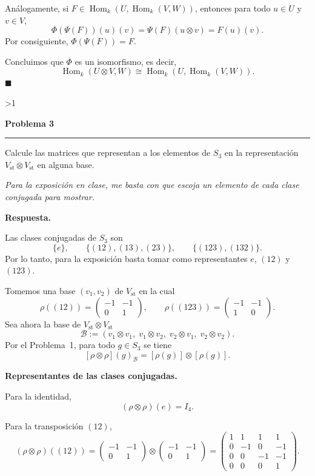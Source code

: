 \documentclass[10pt,a4paper]{article}
\newcommand{\Hom}{\operatorname{Hom}}
\newcommand{\inlinehead}[2][repblue]{%
  \par\smallskip
  {\color{#1}\bfseries #2.}\hspace{0.45em}%
}
\newcommand{\answer}{\inlinehead{Respuesta}}
\newcounter{probcnt}
\newcommand{\problem}[2]{%
  \stepcounter{probcnt}%
  \ifnum\value{probcnt}>1\newpage\fi
  \par\vspace{0.25em}
  {\large\bfseries\color{repblue} Problema #1}\par
  {\color{repline}\rule{\linewidth}{0.55pt}}\par
  \begin{tcolorbox}[
    breakable,
    colback=white,
    colframe=repline,
    borderline west={1.6pt}{0pt}{repteal},
    left=0.7em,
    right=0.7em,
    top=0.35em,
    bottom=0.3em,
    before skip=0.35em,
    after skip=0.45em
  ]
    #2
  \end{tcolorbox}
}
\begin{document}
Análogamente, si $F\in \Hom_k(U,\Hom_k(V,W))$, entonces para todo
$u\in U$ y $v\in V$,
\[
  \Phi(\Psi(F))(u)(v)=\Psi(F)(u\otimes v)=F(u)(v).
\]
Por consiguiente, $\Phi(\Psi(F))=F$.

Concluimos que $\Phi$ es un isomorfismo, es decir,
\[
  \Hom_k(U \otimes V, W) \cong \Hom_k(U, \Hom_k(V, W)).
\]
\hfill$\blacksquare$

\problem{3}{%
Calcule las matrices que representan a los elementos de $S_3$ en la representación
$V_{\mathrm{st}} \otimes V_{\mathrm{st}}$ en alguna base.

\smallskip
\textit{Para la exposición en clase, me basta con que escoja un elemento de cada clase
conjugada para mostrar.}
}

\answer
Las clases conjugadas de $S_3$ son
\[
  \{e\},
  \qquad
  \{(12),(13),(23)\},
  \qquad
  \{(123),(132)\}.
\]
Por lo tanto, para la exposición basta tomar como representantes
$e$, $(12)$ y $(123)$.

Tomemos una base $(v_1,v_2)$ de $V_{\mathrm{st}}$ en la cual
\[
  \rho((12))=
  \begin{pmatrix}
    -1 & -1 \\
    0 & 1
  \end{pmatrix},
  \qquad
  \rho((123))=
  \begin{pmatrix}
    -1 & -1 \\
    1 & 0
  \end{pmatrix}.
\]
Sea ahora la base de $V_{\mathrm{st}}\otimes V_{\mathrm{st}}$
\[
  \mathcal{B}:=(v_1\otimes v_1,\; v_1\otimes v_2,\; v_2\otimes v_1,\; v_2\otimes v_2).
\]
Por el Problema~1, para todo $g\in S_3$ se tiene
\[
  [\rho\otimes\rho](g)_{\mathcal{B}} = [\rho(g)]\otimes [\rho(g)].
\]

\medskip
\textbf{Representantes de las clases conjugadas.}

Para la identidad,
\[
  (\rho\otimes\rho)(e)=I_4.
\]

Para la transposición $(12)$,
\[
  (\rho\otimes\rho)((12))
  =
  \begin{pmatrix}
    -1 & -1 \\
    0 & 1
  \end{pmatrix}
  \otimes
  \begin{pmatrix}
    -1 & -1 \\
    0 & 1
  \end{pmatrix}
  =
  \begin{pmatrix}
    1 & 1 & 1 & 1 \\
    0 & -1 & 0 & -1 \\
    0 & 0 & -1 & -1 \\
    0 & 0 & 0 & 1
  \end{pmatrix}.
\]
\end{document}
